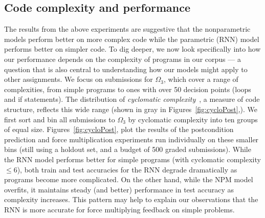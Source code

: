 \subsection{Code complexity and performance}
The results from the above experiments are suggestive
that the nonparametric models perform better on more complex
code while the parametric (RNN) model performs better on simpler
code.  To dig deeper, we now look specifically into how our performance depends on the complexity of programs in our corpus
 --- a question that is also central to understanding how our models might apply to other assignments. We focus on submissions for $\Omega_3$, which cover a range of complexities, from simple programs to ones with over 50 decision points (loops and if statements). The distribution of \emph{cyclomatic complexity}~\cite{mccabe1976complexity}, a measure of code structure, reflects this wide range (shown in gray in Figures~\ref{fig:cycloPost},). 
We first sort and bin all submissions to $\Omega_3$  by cyclomatic complexity into ten groups of equal size.
Figures~\ref{fig:cycloPost}, plot the results
of the postcondition prediction and force multiplication experiments run individually on these smaller bins (still using a holdout set, and a budget of 500 graded submissions).  
While the RNN model performs better for simple programs (with cyclomatic complexity $\leq 6$), both train and test accuracies for the RNN degrade dramatically as programs become more complicated. On the other hand, while the NPM model overfits, 
it maintains steady (and better) performance in test accuracy 
as complexity increases. 
This pattern may help to explain our observations that the RNN is more accurate for force multiplying feedback on simple problems.


